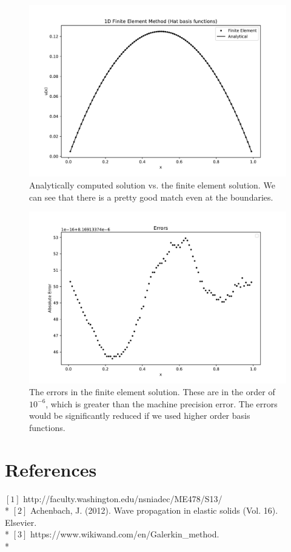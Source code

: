 \documentclass{article}
\begin{document}
\begin{figure}[!htb]
    \centering
    \includegraphics[scale=0.45]{fe_sol.pdf}
    \caption{Analytically computed solution vs. the finite element solution. We can see that there is a pretty good match even at the boundaries.}
\end{figure}
\begin{figure}[!htb]
    \centering
    \includegraphics[scale=0.45]{fe_err.pdf}
    \caption{The errors in the finite element solution. These are in the order of $10^{-6}$, which is greater than the machine precision error. The errors would be significantly reduced if we used higher order basis functions.}
\end{figure}

\section{References}
$[1]$ http://faculty.washington.edu/nsniadec/ME478/S13/ \\* 
$[2]$ Achenbach, J. (2012). Wave propagation in elastic solids (Vol. 16). Elsevier.\\*
$[3]$ https://www.wikiwand.com/en/Galerkin\_method. \\*
\end{document}
